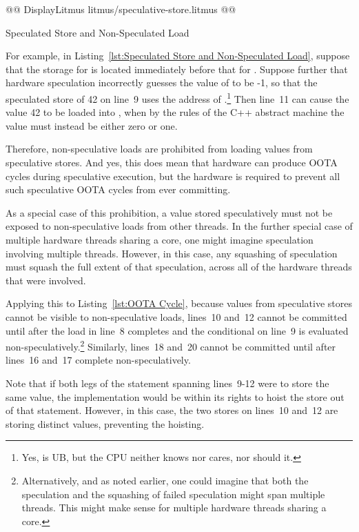 \documentclass[10]{article}
\begin{document}
\begin{listing}[tbp]
@@ DisplayLitmus litmus/speculative-store.litmus @@
\caption{Speculated Store and Non-Speculated Load}
\label{lst:Speculated Store and Non-Speculated Load}
\end{listing}

For example, in Listing~\ref{lst:Speculated Store and Non-Speculated Load},
suppose that the storage for  is located immediately before that
for .
Suppose further that hardware speculation incorrectly guesses the value
of  to be -1, so that the speculated store of 42 on line~9 uses
the address of .\footnote{
	Yes,  is UB, but the CPU neither knows
	nor cares, nor should it.}
Then line~11 can cause the value 42 to be loaded into , when
by the rules of the C++ abstract machine the value must instead be
either zero or one.

Therefore, non-speculative loads are prohibited from loading values from
speculative stores.
And yes, this does mean that hardware can produce OOTA cycles during
speculative execution, but the hardware is required to prevent all such
speculative OOTA cycles from ever committing.

As a special case of this prohibition, a value stored speculatively must
not be exposed to non-speculative loads from other threads.
In the further special case of multiple hardware threads sharing a core,
one might imagine speculation involving multiple threads.
However, in this case, any squashing of speculation must squash the
full extent of that speculation, across all of the hardware threads
that were involved.

Applying this to Listing~\ref{lst:OOTA Cycle}, because values from
speculative stores cannot be visible to non-speculative loads, lines~10
and~12 cannot be committed until after the load in line~8 completes
and the conditional on line~9 is evaluated non-speculatively.\footnote{
	Alternatively, and as noted earlier, one could imagine that both
	the speculation and the squashing of failed speculation might
	span multiple threads.
	This might make sense for multiple hardware threads sharing
	a core.}
Similarly, lines~18 and~20 cannot be committed until after lines~16
and~17 complete non-speculatively.

Note that if both legs of the  statement spanning lines~9-12 were
to store the same value, the implementation would be within its rights
to hoist the store out of that  statement.
However, in this case, the two stores on lines~10 and~12 are storing
distinct values, preventing the hoisting.
\end{document}

